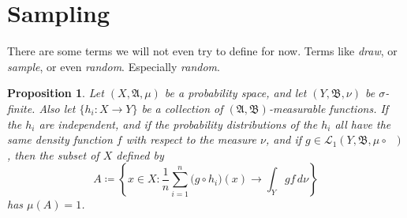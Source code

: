 \documentclass[
twoside=true,
paper=letter,
fontsize=9pt,
pagesize=auto,
leqno,
openany,
headsepline,
overfullrule,
]{scrbook}
\theoremstyle{plain}
\theoremstyle{plain}
\newtheorem{prop}[thm]{Proposition}
\theoremstyle{definition}
\theoremstyle{bfnoteitalic}
\theoremstyle{bfnoteroman}
\newcommand{\sigalg}[1]{\mathfrak{#1}}
\newcommand{\cali}[1]{\mathscr{#1}}
\newcommand{\definedby}{\coloneqq}
\newcommand{\textsigma}{\hbox{\large{$\sigma$}}\kern-1pt}
\newcommand{\preimage}[1]{\mathop{#1^{\leftarrow}}}
\newcommand{\sigmaalgebra}{\sigalg{A}}
\newcommand{\sigmaalgebraii}{\sigalg{B}}
\newcommand{\funcf}{f}
\newcommand{\funcg}{g}
\newcommand{\funch}{h}
\newcommand{\function}{f}
\newcommand{\functionii}{g}
\newcommand{\functioniii}{h}
\newcommand{\measurespace}{X}
\newcommand{\measurespaceii}{Y}
\newcommand{\mspaceelt}{x}
\newcommand{\measure}{\mu}
\newcommand{\measmu}{\mu}
\newcommand{\measnu}{\nu}
\newcommand{\seti}{A}
\begin{document}
\section{Sampling}
There are some terms we will not even try to define for now.
Terms like \emph{draw}, or \emph{sample}, or even \emph{random}. Especially \emph{random}.



\begin{prop}\label{sampling}
Let $(\measurespace,\sigmaalgebra,\measmu)$ be a probability space, and let 
$(\measurespaceii,\sigmaalgebraii,\measnu)$ be \textsigma-finite.
Also let
$\{ \funch_i:\measurespace\to\measurespaceii \}$ be a collection of 
$(\sigmaalgebra,\sigmaalgebraii)$\hyp{}measurable functions.
If the $\funch_i$ are independent, and if the probability distributions of the 
$\funch_i$ all have the same density function 
$\funcf$ 
with respect to the measure $\measnu$,
and if 
$\funcg\in
\cali{L}_1(\measurespaceii,\sigmaalgebraii,\measmu\circ\preimage{\funch_i})$,
then the subset of $\measurespace$ defined by
\[
\seti \definedby
\left\{ 
\mspaceelt\in\measurespace : 
\frac{1}{n} \sum_{i=1}^n \bigl( \functionii\circ \functioniii_i \bigr) (x) 
\to
\int_\measurespaceii \functionii \function \,d\measnu 
\right\}
\]
has $\measure(\seti) = 1$.
\end{prop}
\end{document}
